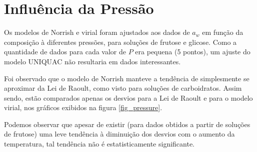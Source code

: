 \documentclass[
	12pt,				%
	openright,
	twoside,
	a4paper,			%
	english,			%
	french,				%
	spanish,			%
	brazil				%
	]{abntex2}
\begin{document}
\section{Influência da Pressão}

Os modelos de Norrish e virial foram ajustados aos dados de $a_w$ em função da
composição à diferentes pressões, para soluções de frutose e glicose. Como a
quantidade de dados para cada valor de $P$ era pequena (5 pontos), um ajuste
do modelo UNIQUAC não resultaria em dados interessantes.

Foi observado que o modelo de Norrish manteve a tendência de simplesmente se
aproximar da Lei de Raoult, como visto para soluções de carboidratos. Assim sendo,
estão comparados apenas os desvios para a Lei de Raoult e para o modelo virial,
nos gráficos exibidos na figura \ref{fig_pressure}.

Podemos observar que apesar de existir (para dados obtidos a partir de soluções
de frutose) uma leve tendência à diminuição dos desvios com o aumento da temperatura,
tal tendência não é estatisticamente significante.
\end{document}

